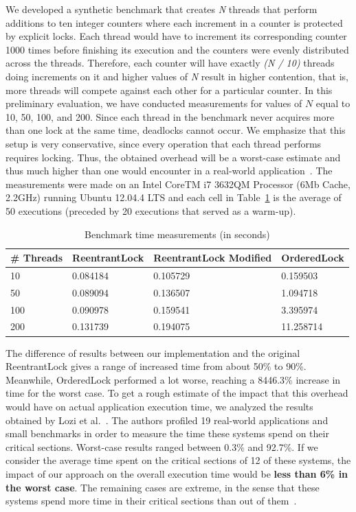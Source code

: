 We developed a synthetic benchmark that creates \emph{N} threads that perform additions to ten integer counters where each increment in a counter is protected by explicit locks. Each thread would have to increment its corresponding counter 1000 times before finishing its execution and the counters were evenly distributed across the threads. Therefore, each counter will have exactly \emph{(N / 10)} threads doing increments on it and higher values of \emph{N} result in higher contention, that is, more threads will compete against each other for a particular counter. In this preliminary evaluation, we have conducted measurements for values of $N$ equal to 10, 50, 100, and 200. Since each thread in the benchmark never acquires more than one lock at the same time, deadlocks cannot occur. We emphasize that this setup is very conservative, since every operation that each thread performs requires locking. Thus, the obtained overhead will be a worst-case estimate and thus much higher than one would encounter in a real-world application~\cite{lozi}. The measurements were made on an Intel CoreTM i7 3632QM Processor (6Mb Cache, 2.2GHz) running Ubuntu 12.04.4 LTS and each cell in Table~\ref{tab:overhead} is the average of 50 executions (preceded by 20 executions that served as a warm-up). 

\begin{table}
\begin{center}
\caption{Benchmark time measurements (in seconds)}\label{tab:overhead}
\begin{tabular}{|l|l|l|l|}
\hline
\# Threads & ReentrantLock & ReentrantLock Modified & OrderedLock \\
\hline
10 & 0.084184 & 0.105729 & 0.159503\\
50 & 0.089094 & 0.136507 & 1.094718\\
100 & 0.090978 & 0.159541 & 3.395974\\
200 & 0.131739 & 0.194075 & 11.258714\\
\hline
\end{tabular}
\end{center}
\end{table}

The difference of results between our implementation and the original ReentrantLock gives a range of increased time from about 50\% to 90\%. Meanwhile, OrderedLock performed a lot worse, reaching a 8446.3\% increase in time for the worst case. To get a rough estimate of the impact that this overhead would have on actual application execution time, we analyzed the results obtained by Lozi et al.~\cite{lozi}. The authors profiled 19 real-world applications and small benchmarks in order to measure the time these systems spend on their critical sections. Worst-case results ranged between 0.3\% and 92.7\%. If we consider the average time spent on the critical sections of 12 of these systems, the impact of our approach on the overall execution time would be \textbf{less than 6\% in the worst case}. The remaining cases are extreme, in the sense that these systems spend more time in their critical sections than out of them~\cite{lozi}. 

